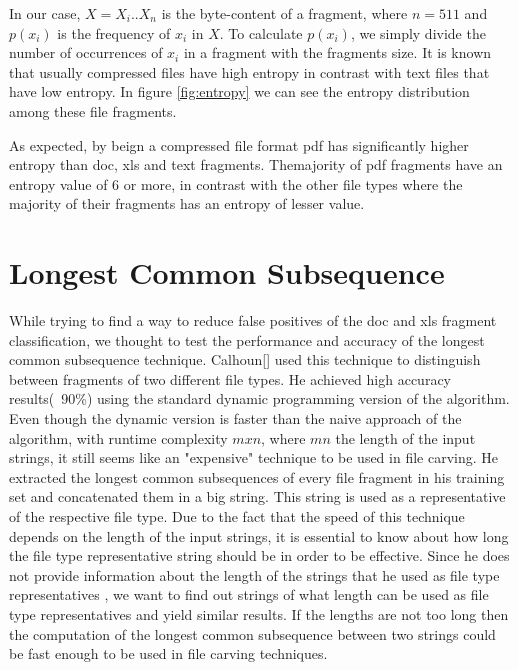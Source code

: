 In our case, $X={X_i}..{X_n}$  is the byte-content of a fragment, where $n=511$  and $p({x_i})$ is the frequency of ${x_i}$ in ${X}$. To calculate $p({x_i})$, we simply divide the number of occurrences of ${x_i}$ in a fragment with the fragments size. It is known that usually compressed files have high entropy in contrast with text files that have low entropy\cite{Calhoun}\cite{Jeroen}. In figure \ref{fig:entropy} we can see the entropy distribution among these file fragments.

As expected, by beign a compressed file format pdf has significantly higher entropy than doc, xls and text fragments. Themajority of pdf fragments have an entropy value of 6 or more, in contrast with the other file types  where the majority of their fragments has an entropy of lesser value.

\section{Longest Common Subsequence}
While trying to find a way to reduce false positives of the doc and xls fragment classification, we thought to test the performance and accuracy of the longest common subsequence technique. Calhoun[] used this technique to distinguish between fragments of two different file types. He achieved high accuracy results(~90\%) using the standard dynamic programming version of the algorithm. Even though the dynamic version is faster than the naive approach of the algorithm, with runtime complexity $mxn$, where $m n $ the length of the input strings, it still seems like an "expensive" technique to be used in file carving. He extracted the longest common subsequences of every file fragment in his training set and concatenated them in a big string. This string is used as a representative of the respective file type.  Due to the fact that the speed of this technique depends on the length of the input strings, it is essential to know about how long the file type representative string should be in order to be effective. Since he does not provide information about the length of the strings that he used as file type representatives , we want to find out strings of what length can be used as file type representatives and yield similar results. If the lengths are not too long then the computation of the longest common subsequence between two strings could be fast enough to be used in file carving techniques.

